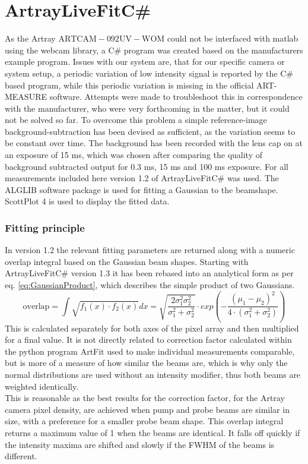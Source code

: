 \documentclass[twoside,openright,listof=numbered]{scrreprt}
\begin{document}
\section{ArtrayLiveFitC\#}\label{sec:LiveFitting}
As the Artray $\mathrm{ARTCAM-092UV-WOM}$ could not be interfaced with matlab using the webcam library, a C\# program was created based on the manufacturers example program.\cite{Artray2018}
Issues with our system are, that for our specific camera or system setup, a periodic variation of low intensity signal is reported by the C\# based program, while this periodic variation is missing in the official ART-MEASURE software. Attempts were made to troubleshoot this in correspondence with the manufacturer, who were very forthcoming in the matter, but it could not be solved so far. To overcome this problem a simple reference-image background-subtraction has been devised as sufficient, as the variation seems to be constant over time. The background has been recorded with the lens cap on at an exposure of 15 ms, which was chosen after comparing the quality of background subtracted output for 0.3 ms, 15 ms and 100 ms exposure. 
\newline
For all measurements included here version 1.2 of ArtrayLiveFitC\# was used. The ALGLIB\cite{Bochkanov2024} software package is used for fitting a Gaussian to the beamshape. ScottPlot 4\cite{ScottPlot4} is used to display the fitted data.\\
\subsubsection{Fitting principle}
In version 1.2 the relevant fitting parameters are returned along with a numeric overlap integral based on the Gaussian beam shapes. Starting with ArtrayLiveFitC\# version 1.3 it has been rebased into an analytical form as per eq. \ref{eq:GaussianProduct}, which describes the simple product of two Gaussians.
\begin{equation}
\mathrm{overlap} = \int \sqrt{f_1(x)\cdot f_2(x)}dx =  \sqrt{\frac{2 \sigma_1^2\sigma_2^2}{\sigma_1^2+\sigma_2^2}}\cdot exp\left(-\frac{\left(\mu_1-\mu_2\right)^2}{4\cdot \left(\sigma_1^2 + \sigma_2^2\right)}\right)\label{eq:GaussianProduct}
\end{equation}
This is calculated separately for both axes of the pixel array and then multiplied for a final value. 
It is not directly related to correction factor calculated within the python program ArtFit used to make individual measurements comparable, but is more of a measure of how similar the beams are, which is why only the normal distributions are used without an intensity modifier, thus both beams are weighted identically. \\
This is reasonable as the best results for the correction factor, for the Artray camera pixel density, are achieved when pump and probe beams are similar in size, with a preference for a smaller probe beam shape. This overlap integral returns a maximum value of 1 when the beams are identical. It falls off quickly if the intensity maxima are shifted and slowly if the FWHM of the beams is different.\\
\end{document}
